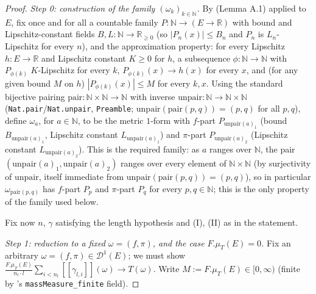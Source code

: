 \begin{proof}
  \emph{Step 0: construction of the family $(\omega_k)_{k\in\mathbb{N}}$.} By
   (Lemma A.1) applied to $E$, fix once and for all a countable family
  $P\colon \mathbb{N}\to(E\to\mathbb{R})$ with bound and Lipschitz-constant fields $B,L\colon
  \mathbb{N}\to\mathbb{R}_{\ge0}$ (so $|P_n(x)|\le B_n$ and $P_n$ is $L_n$-Lipschitz for every $n$),
  and the approximation property: for every Lipschitz $h\colon E\to\mathbb{R}$ and Lipschitz
  constant $K\ge0$ for $h$, a subsequence $\phi\colon\mathbb{N}\to\mathbb{N}$ with $P_{\phi(k)}$
  $K$-Lipschitz for every $k$, $P_{\phi(k)}(x)\to h(x)$ for every $x$, and (for any given bound $M$
  on $h$) $|P_{\phi(k)}(x)|\le M$ for every $k,x$. Using the standard bijective pairing
  $\mathrm{pair}\colon\mathbb{N}\times\mathbb{N}\to\mathbb{N}$ with inverse
  $\mathrm{unpair}\colon\mathbb{N}\to\mathbb{N}\times\mathbb{N}$
  (\texttt{Nat.pair}/\texttt{Nat.unpair}, \texttt{Preamble}; $\mathrm{unpair}(\mathrm{pair}(p,q)) =
  (p,q)$ for all $p,q$), define $\omega_a$, for $a\in\mathbb{N}$, to be the metric $1$-form with
  $f$-part $P_{\mathrm{unpair}(a)_1}$ (bound $B_{\mathrm{unpair}(a)_1}$, Lipschitz constant
  $L_{\mathrm{unpair}(a)_1}$) and $\pi$-part $P_{\mathrm{unpair}(a)_2}$ (Lipschitz constant
  $L_{\mathrm{unpair}(a)_2}$). This is the required family: as $a$ ranges over $\mathbb{N}$, the
  pair $(\mathrm{unpair}(a)_1,\mathrm{unpair}(a)_2)$ ranges over every element of
  $\mathbb{N}\times\mathbb{N}$ (by surjectivity of $\mathrm{unpair}$, itself immediate from
  $\mathrm{unpair}(\mathrm{pair}(p,q))=(p,q)$), so in particular $\omega_{\mathrm{pair}(p,q)}$ has
  $f$-part $P_p$ and $\pi$-part $P_q$ for every $p,q\in\mathbb{N}$; this is the only property of
  the family used below.

  Fix now $n$, $\gamma$ satisfying the length hypothesis and (I), (II) as in the statement.

  \emph{Step 1: reduction to a fixed $\omega=(f,\pi)$, and the case $F.\mu_T(E)=0$.} Fix an
  arbitrary $\omega=(f,\pi)\in\mathcal{D}^1(E)$; we must show
  $\frac{F.\mu_T(E)}{n_l\cdot l}\sum_{i<n_l}[[\gamma_{l,i}]](\omega)\to T(\omega)$. Write
  $M:=F.\mu_T(E)\in[0,\infty)$ (finite by 's \texttt{massMeasure\_finite} field).


\end{proof}
